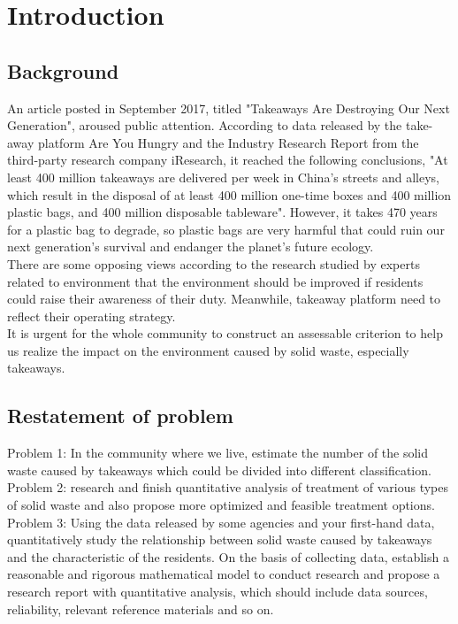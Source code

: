 \documentclass[UTF8]{article}
\begin{document}
\newpage
\section{Introduction}
\subsection{Background}
An article posted in September 2017, titled "Takeaways Are Destroying Our Next Generation", aroused public attention. According to data released by the take-away platform Are You Hungry and the Industry Research Report from the third-party research company iResearch, it reached the following conclusions, "At least 400 million takeaways are delivered per week in China's streets and alleys, which result in the disposal of at least 400 million one-time boxes and 400 million plastic bags, and 400 million disposable tableware". However, it takes 470 years for a plastic bag to degrade, so plastic bags are very harmful that could ruin our next generation's survival and endanger the planet's future ecology.\\
\indent There are some opposing views according to the research studied by experts related to environment that the environment should be improved if residents could raise their awareness of their duty. Meanwhile, takeaway platform need to reflect their operating strategy.\\
\indent It is urgent for the whole community to construct an assessable criterion to help us realize the impact on the environment caused by solid waste, especially takeaways.
\subsection{Restatement of problem}
Problem 1: In the community where we live, estimate the number of the solid waste caused by takeaways which could be divided into different classification.\\
\indent Problem 2: research and finish quantitative analysis of treatment of various types of solid waste and also propose more optimized and feasible treatment options.\\
\indent Problem 3: Using the data released by some agencies and your first-hand data, quantitatively study the relationship between solid waste caused by takeaways and the characteristic of the residents. On the basis of collecting data, establish a reasonable and rigorous mathematical model to conduct research and propose a research report with quantitative analysis, which should include data sources, reliability, relevant reference materials and so on.
\end{document}

